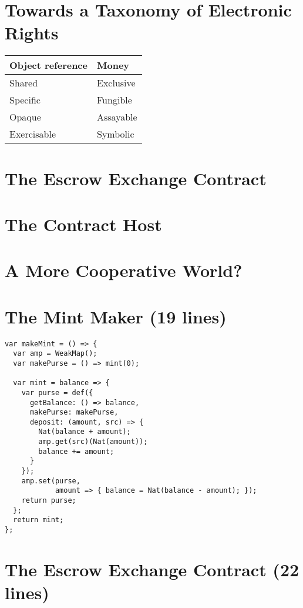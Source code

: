\documentclass{llncs}
\begin{document}
\section{Towards a Taxonomy of Electronic Rights}

\begin{tabular}{ l l }
  Object reference & Money \\ \hline
  Shared & Exclusive \\
  Specific & Fungible \\
  Opaque & Assayable \\
  Exercisable & Symbolic \\
\end{tabular}

\section{The Escrow Exchange Contract}


\section{The Contract Host}
\section{A More Cooperative World?}


% 



\appendix

\section{The Mint Maker (19 lines)}
\label{makeMint}

\begin{verbatim}
var makeMint = () => {
  var amp = WeakMap();
  var makePurse = () => mint(0);
  
  var mint = balance => {
    var purse = def({
      getBalance: () => balance,
      makePurse: makePurse,
      deposit: (amount, src) => {
        Nat(balance + amount);
        amp.get(src)(Nat(amount)); 
        balance += amount; 
      } 
    });
    amp.set(purse, 
            amount => { balance = Nat(balance - amount); });
    return purse;
  };
  return mint;
};
\end{verbatim}

\section{The Escrow Exchange Contract (22 lines)}
\label{escrowExchange}
\end{document}
